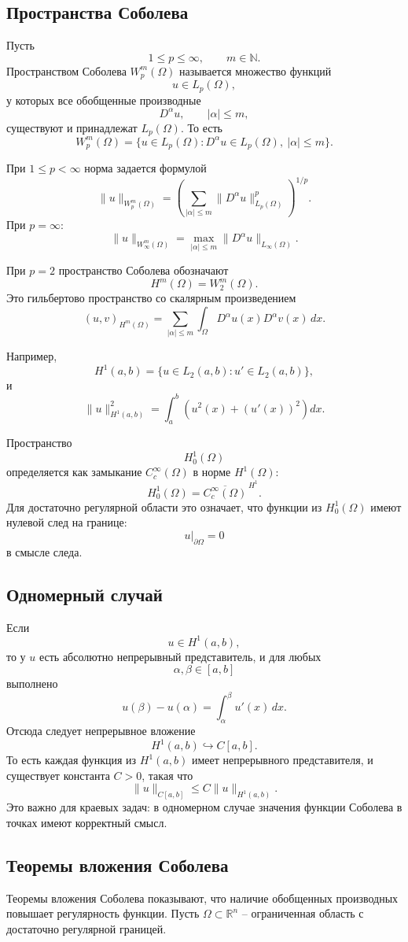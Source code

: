 \documentclass[12pt,a4paper]{article}
\newcommand{\R}{\mathbb{R}}
\begin{document}
\subsection*{Пространства Соболева}
Пусть
\[
1\le p\le\infty,
\qquad
m\in\mathbb N.
\]
Пространством Соболева \(W_p^m(\Omega)\) называется множество функций
\[
u\in L_p(\Omega),
\]
у которых все обобщенные производные
\[
D^\alpha u,
\qquad |\alpha|\le m,
\]
существуют и принадлежат \(L_p(\Omega)\). То есть
\[
W_p^m(\Omega)=
\{u\in L_p(\Omega):D^\alpha u\in L_p(\Omega),\ |\alpha|\le m\}.
\]

При \(1\le p<\infty\) норма задается формулой
\[
\|u\|_{W_p^m(\Omega)}=
\left(
\sum_{|\alpha|\le m}
\|D^\alpha u\|_{L_p(\Omega)}^p
\right)^{1/p}.
\]
При \(p=\infty\):
\[
\|u\|_{W_\infty^m(\Omega)}=
\max_{|\alpha|\le m}
\|D^\alpha u\|_{L_\infty(\Omega)}.
\]

При \(p=2\) пространство Соболева обозначают
\[
H^m(\Omega)=W_2^m(\Omega).
\]
Это гильбертово пространство со скалярным произведением
\[
(u,v)_{H^m(\Omega)}=
\sum_{|\alpha|\le m}
\int_\Omega D^\alpha u(x)D^\alpha v(x)\,dx.
\]

Например,
\[
H^1(a,b)=\{u\in L_2(a,b):u'\in L_2(a,b)\},
\]
и
\[
\|u\|_{H^1(a,b)}^2=
\int_a^b\left(u^2(x)+(u'(x))^2\right)dx.
\]

Пространство
\[
H_0^1(\Omega)
\]
определяется как замыкание \(C_c^\infty(\Omega)\) в норме \(H^1(\Omega)\):
\[
H_0^1(\Omega)=\overline{C_c^\infty(\Omega)}^{\,H^1}.
\]
Для достаточно регулярной области это означает, что функции из \(H_0^1(\Omega)\) имеют нулевой след на границе:
\[
u|_{\partial\Omega}=0
\]
в смысле следа.

\subsection*{Одномерный случай}
Если
\[
u\in H^1(a,b),
\]
то у \(u\) есть абсолютно непрерывный представитель, и для любых
\[
\alpha,\beta\in[a,b]
\]
выполнено
\[
u(\beta)-u(\alpha)=\int_\alpha^\beta u'(x)\,dx.
\]
Отсюда следует непрерывное вложение
\[
H^1(a,b)\hookrightarrow C[a,b].
\]
То есть каждая функция из \(H^1(a,b)\) имеет непрерывного представителя, и существует константа \(C>0\), такая что
\[
\|u\|_{C[a,b]}\le C\|u\|_{H^1(a,b)}.
\]
Это важно для краевых задач: в одномерном случае значения функции Соболева в точках имеют корректный смысл.

\subsection*{Теоремы вложения Соболева}
Теоремы вложения Соболева показывают, что наличие обобщенных производных повышает регулярность функции. Пусть \(\Omega\subset\R^n\) -- ограниченная область с достаточно регулярной границей.
\end{document}
